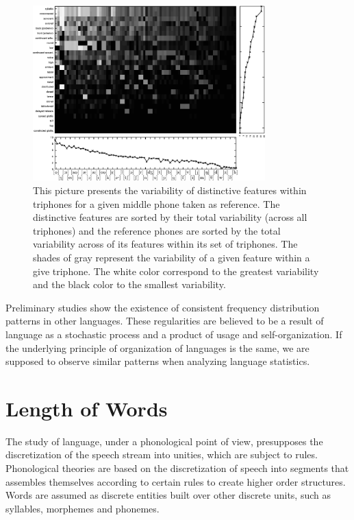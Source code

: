 \begin{figure}
\centering  
\includegraphics[width=0.8\textwidth]{images/phone_triphone_varialibity_dist_features_sorted2.pdf}  
\caption{This picture presents the variability of distinctive features within triphones for a given
middle phone taken as reference. The distinctive features are sorted by their total variability 
(across all triphones) and the reference phones are sorted by the total variability across of its 
features within its set of triphones. The shades of gray represent the variability of a given 
feature within a give triphone. The white color correspond to the greatest variability and the
black color to the smallest variability.}
\label{fig:phone_triphone_varialibity_dist_features_sorted2}  
\end{figure}




Preliminary studies show the existence of consistent frequency distribution patterns in other languages.
These regularities are believed to be a result of language as a stochastic process and a product
of usage and self-organization. If the underlying principle of organization of languages is the same,
we are supposed to observe similar patterns when analyzing language statistics.







\section{Length of Words}
\label{sec:words_length}
The study of language, under a phonological point of view, presupposes
the discretization of the speech stream into unities, which are subject to rules.
Phonological theories are based on the discretization of speech into segments
that assembles themselves according to certain rules to create higher order
structures. 
Words are assumed as discrete entities built over other discrete
units, such as syllables, morphemes and phonemes.

